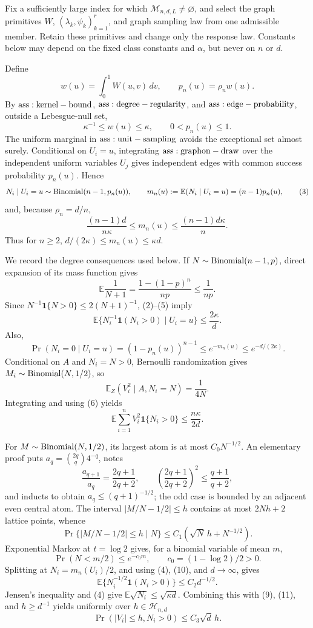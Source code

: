 Fix a sufficiently large index for which \(\mathcal M_{n,d,L}\ne\varnothing\), and select the graph primitives \(W\), \((\lambda_k,\psi_k)_{k=1}^r\), and graph sampling law from one admissible member.  Retain these primitives and change only the response law.  Constants below may depend on the fixed class constants and \(\alpha\), but never on \(n\) or \(d\).

Define
\[
 w(u)=\int_0^1W(u,v)\,dv,
 \qquad p_n(u)=\rho_nw(u).
\tag{1}
\]
By \({\rm ass:kernel-bound}\), \({\rm ass:degree-regularity}\), and \({\rm ass:edge-probability}\), outside a Lebesgue-null set,
\[
 \kappa^{-1}\leq w(u)\leq\kappa,
 \qquad 0<p_n(u)\leq1.
\tag{2}
\]
The uniform marginal in \({\rm ass:unit-sampling}\) avoids the exceptional set almost surely.  Conditional on \(U_i=u\), integrating \({\rm ass:graphon-draw}\) over the independent uniform variables \(U_j\) gives independent edges with common success probability \(p_n(u)\).  Hence
\[
 N_i\mid U_i=u\sim{\rm Binomial}(n-1,p_n(u)),
 \qquad m_n(u):=\mathbb E(N_i\mid U_i=u)=(n-1)p_n(u),
\tag{3}
\]
and, because \(\rho_n=d/n\),
\[
 \frac{(n-1)d}{n\kappa}\leq m_n(u)\leq\frac{(n-1)d\kappa}{n}.
\tag{4}
\]
Thus for \(n\geq2\), \(d/(2\kappa)\leq m_n(u)\leq\kappa d\).

We record the degree consequences used below.  If \(N\sim{\rm Binomial}(n-1,p)\), direct expansion of its mass function gives
\[
 \mathbb E\frac1{N+1}=\frac{1-(1-p)^n}{np}\leq\frac1{np}.
\tag{5}
\]
Since \(N^{-1}\mathbf1\{N>0\}\leq2(N+1)^{-1}\), (2)--(5) imply
\[
 \mathbb E\{N_i^{-1}\mathbf1(N_i>0)\mid U_i=u\}\leq\frac{2\kappa}{d}.
\tag{6}
\]
Also,
\[
 \Pr(N_i=0\mid U_i=u)=(1-p_n(u))^{n-1}
 \leq e^{-m_n(u)}\leq e^{-d/(2\kappa)}.
\tag{7}
\]
Conditional on \(A\) and \(N_i=N>0\), Bernoulli randomization gives \(M_i\sim{\rm Binomial}(N,1/2)\), so
\[
 \mathbb E_Z(V_i^2\mid A,N_i=N)=\frac1{4N}.
\]
Integrating and using (6) yields
\[
 \mathbb E\sum_{i=1}^nV_i^2\mathbf1\{N_i>0\}\leq\frac{n\kappa}{2d}.
\tag{8}
\]

For \(M\sim{\rm Binomial}(N,1/2)\), its largest atom is at most \(C_0N^{-1/2}\).  An elementary proof puts \(a_q={2q\choose q}4^{-q}\), notes
\[
 \frac{a_{q+1}}{a_q}=\frac{2q+1}{2q+2},
 \qquad \left(\frac{2q+1}{2q+2}\right)^2\leq\frac{q+1}{q+2},
\]
and inducts to obtain \(a_q\leq(q+1)^{-1/2}\); the odd case is bounded by an adjacent even central atom.  The interval \(|M/N-1/2|\leq h\) contains at most \(2Nh+2\) lattice points, whence
\[
 \Pr\{|M/N-1/2|\leq h\mid N\}
 \leq C_1(\sqrt N\,h+N^{-1/2}).
\tag{9}
\]
Exponential Markov at \(t=\log2\) gives, for a binomial variable of mean \(m\),
\[
 \Pr(N<m/2)\leq e^{-c_0m},
 \qquad c_0=(1-\log2)/2>0.
\tag{10}
\]
Splitting at \(N_i=m_n(U_i)/2\), and using (4), (10), and \(d\to\infty\), gives
\[
 \mathbb E\{N_i^{-1/2}\mathbf1(N_i>0)\}\leq C_2d^{-1/2}.
\tag{11}
\]
Jensen's inequality and (4) give \(\mathbb E\sqrt{N_i}\leq\sqrt{\kappa d}\).  Combining this with (9), (11), and \(h\geq d^{-1}\) yields uniformly over \(h\in\mathcal H_{n,d}\)
\[
 \Pr(|V_i|\leq h,N_i>0)\leq C_3\sqrt d\,h.
\tag{12}
\]

